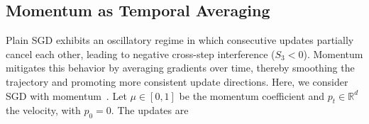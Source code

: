 \subsection{Momentum as Temporal Averaging}
\label{subsec:momentum_method}

Plain SGD exhibits an oscillatory regime in which consecutive updates partially cancel each other, leading to negative cross-step interference ($S_3<0$). Momentum mitigates this behavior by averaging gradients over time, thereby smoothing the trajectory and promoting more consistent update directions. Here, we consider SGD with momentum~\cite{polyak1964methods}. Let $\mu\in[0,1]$ be the momentum coefficient and $p_t\in\mathbb{R}^d$ the velocity, with $p_0=0$. The updates are

